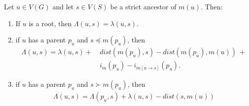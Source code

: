 \documentclass[10pt]{article}
\begin{document}
\begin{lemma}\label{lem:firstcaseloss}
    Let $u \in V(G)$ and let $s \in V(S)$ be a strict ancestor of $m(u)$.
    Then:

    \begin{enumerate}
        \item 
        If $u$ is a root, then $\Lambda(u, s) = \lambda(u, s)$.

        \item 
        if $u$ has a parent $p_u$ and $s \preceq m(p_u)$, then
        \begin{align*}
        \Lambda(u, s) = \lambda(u, s) +  ~&dist(m(p_u) , s) - dist(m(p_u), m(u))~+\\
        &i_{m}(p_u) - i_{m[u \rightarrow s]}(p_u).
        \end{align*}

        \item 
        if $u$ has a parent $p_u$ and $s \succ m(p_u)$, then
        \begin{align*}
        \Lambda(u, s) = \Lambda(p_u, s) + \lambda(u, s) - dist(s, m(u))
        \end{align*}
    \end{enumerate}
\end{lemma}
\end{document}

